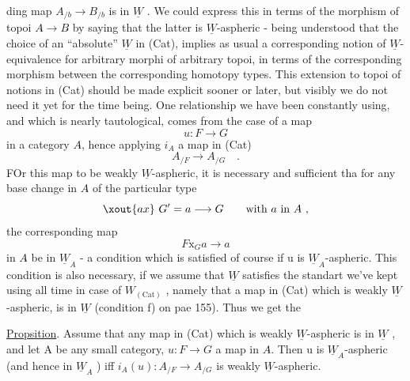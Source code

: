 
ding map  $A_{/b}\longrightarrow B_{/b}$  is in $\underline{W}$ .  We could express this in terms of the
morphism of topoi  $A\hat{}\to B\hat{}$ by saying that the latter is $\underline{W}$-aspheric -
being understood that the choice of an ``absolute'' $\underline{W}$ in (Cat),  implies as
usual a corresponding notion of $\underline{W}$-equivalence for arbitrary  morphi
 of  arbitrary topoi,  in terms of the corresponding morphism between
the corresponding homotopy types. \hand{(}This extension to topoi of notions in
(Cat) should be made  explicit sooner or later,  but visibly we do not
need it  yet for the time being.\hand{)} One  relationship we have been
constantly using,  and which is nearly tautological,  comes from the case
of a map
\[ u\colon F\longrightarrow G \]
in a category $A\hat{}$,  hence applying $i_A$ a map in (Cat)
\[ A_{/F}\longrightarrow A_{/G} \quad . \]
FOr this map to be weakly $\underline{W}$-aspheric,  it is necessary and sufficient tha
for any base change in $A\hat{}$ of the particular type
\[ \xout{ax}\ G' = a \longrightarrow G \qquad \text{with $a$ in $A$ ,} \]
the corresponding map
\[ F\mathrm{x}_G a \longrightarrow a \]
in $A\hat{}$ be in $\underline{W}_A$ - a condition which  is satisfied of course if  u is
$\underline{W}_A$-aspheric.  This  condition is also necessary,  if we assume that $\underline{W}$
satisfies the standart  we've kept using all time in case of
$W_{(\mathrm{Cat})}$ ,  namely that a map in (Cat) which is weakly $\underline{W}$-aspheric,  is in
$\underline{W}$  (condition  f)  on pae 155).   Thus we get the

\uline{Propsition}.  Assume that any map in (Cat) which is weakly $\underline{W}$-aspheric is
in $\underline{W}$ ,  and let  A be any small category,  $u\colon F\to G$ a map in $A\hat{}$. Then u
is  $\underline{W}_A$-aspheric (and hence in $\underline{W}_A$ )  iff  $i_A(u)\colon A_{/F}\to A_{/G}$
is weakly $\underline{W}$-aspheric.

